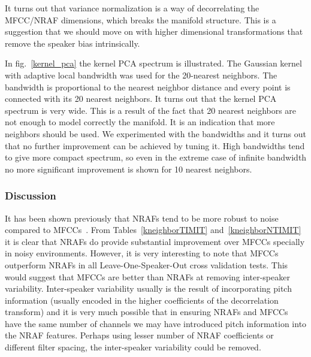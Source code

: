 \documentclass[12pt,letterpaper,doublespaced,ETD,dvips,proposal]{gtthesis}
\begin{document}
\begin{Body}
It turns out that variance normalization is a way of decorrelating
the MFCC/NRAF dimensions, which breaks the manifold structure. This
is a suggestion that we should move on with higher dimensional
transformations that remove the speaker bias intrinsically.

In fig.~\ref{kernel_pca} the kernel PCA spectrum is illustrated. The
Gaussian kernel with adaptive local bandwidth was used for the
20-nearest neighbors. The bandwidth is proportional to the nearest
neighbor distance and every point is connected with its 20 nearest
neighbors. It turns out that the kernel PCA spectrum is very wide.
This is a result of the fact that 20 nearest neighbors are not
enough to model correctly the manifold. It is an indication that
more neighbors should be used. We experimented with the bandwidths
and it turns out that no further improvement can be achieved by
tuning it. High bandwidths tend to give more compact spectrum, so
even in the extreme case of infinite bandwidth no more significant
improvement is shown for 10 nearest neighbors.

\subsubsection{Discussion} It has been shown previously that NRAFs
tend to be more robust to noise compared to
MFCCs~\cite{ravindran:inr}. From Tables~\ref{kneighborTIMIT}
and~\ref{kneighborNTIMIT} it is clear that NRAFs do provide
substantial improvement over MFCCs specially in noisy environments.
However, it is very interesting to note that MFCCs outperform NRAFs
in all Leave-One-Speaker-Out cross validation tests. This would
suggest that MFCCs are better than NRAFs at removing inter-speaker
variability. Inter-speaker variability usually is the result of
incorporating pitch information (usually encoded in the higher
coefficients of the decorrelation transform) and it is very much
possible that in ensuring NRAFs and MFCCs have the same number of
channels we may have introduced pitch information into the NRAF
features. Perhaps using lesser number of NRAF coefficients or
different filter spacing, the inter-speaker variability could be
removed.


\end{Body}
\end{document}
